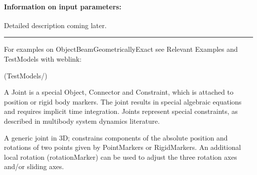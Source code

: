 \paragraph{Information on input parameters:} 
\finishTable
 \noindent
    Detailed description coming later.
\vspace{6pt}\par\noindent\rule{\textwidth}{0.4pt}
%
\noindent For examples on ObjectBeamGeometricallyExact see Relevant Examples and TestModels with weblink:
\bi
\item {} (TestModels/)

\ei

%

\newpage
A Joint is a special Object, Connector and Constraint, which is attached to position or rigid body markers. The joint results in special algebraic equations and requires implicit time integration. Joints represent special constraints, as described in multibody system dynamics literature.


\label{sec:item:ObjectJointGeneric}
A generic joint in 3D; constrains components of the absolute position and rotations of two points given by PointMarkers or RigidMarkers. An additional local rotation (rotationMarker) can be used to adjust the three rotation axes and/or sliding axes.
\vspace{12pt}\\

